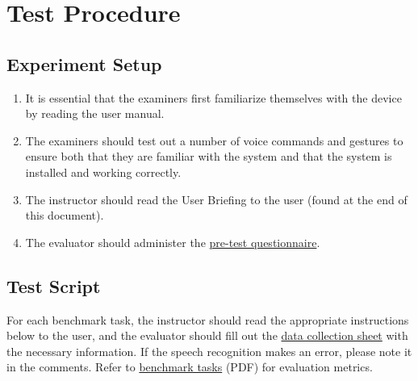 \documentclass[12pt,letterpaper]{article}
\begin{document}
\section{Test Procedure}

\subsection{Experiment Setup}

\begin{enumerate}
\item It is essential that the examiners first familiarize themselves with the device by reading the user manual.
\item The examiners should test out a number of voice commands and gestures to ensure both that they are familiar with the system and that the system is installed and working correctly.
\item The instructor should read the User Briefing to the user (found at the end of this document).
\item The evaluator should administer the \href{http://fluidsurveys.com/s/hciplayer-pretest/}{pre-test questionnaire}.
\end{enumerate}

\subsection{Test Script}

For each benchmark task, the instructor should read the appropriate instructions below to the user, and the evaluator should fill out the \href{http://fluidsurveys.com/s/hciplayer-datacollectionsheet/}{data collection sheet} with the necessary information. If the speech recognition makes an error, please note it in the comments. Refer to \href{http://www.ece.mcgill.ca/~scormi3/hci/docs/benchmark-tasks.pdf}{benchmark tasks} (PDF) for evaluation metrics.
\end{document}
